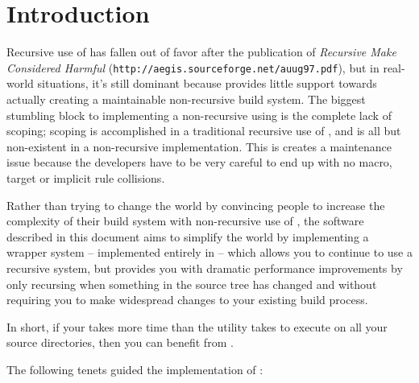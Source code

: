 \chapter{Introduction}

Recursive use of \make has fallen out of favor after the publication
of \emph{Recursive Make Considered Harmful}
(\texttt{http://aegis.sourceforge.net/auug97.pdf}), but in real-world
situations, it's still dominant because \make provides little support
towards actually creating a maintainable non-recursive build system.
The biggest stumbling block to implementing a non-recursive using
\make is the complete lack of scoping; scoping is accomplished in a
traditional recursive use of \make, and is all but non-existent in a
non-recursive implementation.  This is creates a maintenance issue
because the developers have to be very careful to end up with no macro,
target or implicit rule collisions.

Rather than trying to change the world by convincing people to
increase the complexity of their build system with non-recursive use
of \make, the software described in this document aims to simplify the
world by implementing a wrapper system -- implemented entirely in
\gnumake -- which allows you to continue to use a recursive \make
system, but provides you with dramatic performance improvements by
only recursing when something in the source tree has changed and
without requiring you to make widespread changes to your existing
build process.

In short, if your \nullbuild takes more time than the \mtree utility
takes to execute on all your source directories, then you can benefit
from \lmsbw.

The following tenets guided the implementation of \lmsbw:

